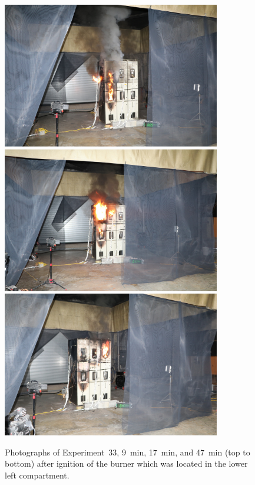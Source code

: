 \begin{figure}[p]
\centering
\includegraphics[height=2.50in]{../FIGURES/Test_33_9_min} \\ \vspace{0.1in}
\includegraphics[height=2.50in]{../FIGURES/Test_33_17_min} \\ \vspace{0.1in}
\includegraphics[height=2.50in]{../FIGURES/Test_33_47_min}
\caption[Photographs of Experiment~33]{Photographs of Experiment~33, 9~min, 17~min, and 47~min (top to bottom) after ignition of the burner which was located in the lower left compartment.}
\label{fig:Test_33_photos}
\end{figure}



